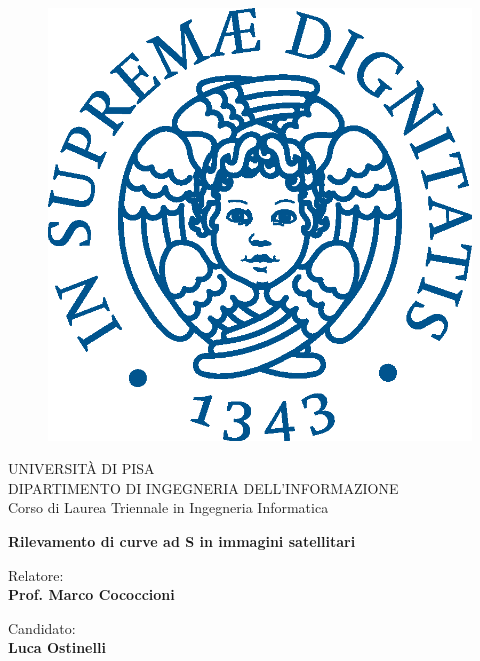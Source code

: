 \begin{titlepage}
\begin{figure}[!htb]
    \centering
    \includegraphics[keepaspectratio=true,scale=0.5]{logo.eps}
\end{figure}

\begin{center}
    \LARGE{UNIVERSITÀ DI PISA}
    \vspace{5mm}
    \\ \large{DIPARTIMENTO DI INGEGNERIA DELL'INFORMAZIONE}
    \vspace{5mm}
    \\ \LARGE{Corso di Laurea Triennale in Ingegneria Informatica}
\end{center}

\vspace{15mm}
\begin{center}
    {\LARGE{\bf Rilevamento di curve ad S in immagini satellitari}}
\end{center}
\vspace{30mm}

\begin{minipage}[t]{0.47\textwidth}
	{\large{Relatore:}{\normalsize\vspace{3mm}
	\bf\\ \large{Prof. Marco Cococcioni}}}
\end{minipage}
\hfill
\begin{minipage}[t]{0.47\textwidth}\raggedleft
	{\large{Candidato:}{\normalsize\vspace{2mm} \bf\\\large{Luca Ostinelli\\ }}}
\end{minipage}

\vspace{25mm}
\hrulefill
\\

\end{titlepage}